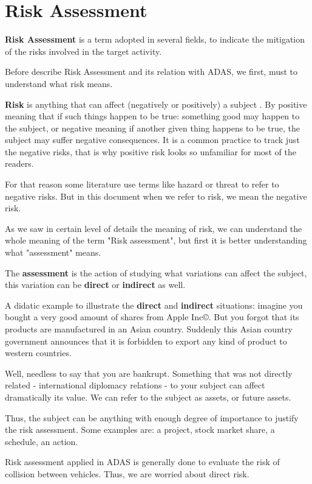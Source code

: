 \section{Risk Assessment}
\label{sec:riskassessment}

\textbf{Risk Assessment} is a term adopted in several fields, to indicate the mitigation of the risks involved in the target activity. 

Before describe Risk Assessment and its relation with ADAS, we first, must to understand what risk means.

\textbf{Risk} is anything that can affect (negatively or positively) a subject \cite{mulcahy2011pmp}. By positive meaning that if such things happen to be true: something good may happen to the subject, or negative meaning if another given thing happens to be true, the subject may suffer negative consequences. It is a common practice to track just the negative risks, that is why positive risk looks so unfamiliar for most of the readers. 

For that reason some literature use terms like hazard or threat to refer to negative risks. But in this document when we refer to risk, we mean the negative risk.

As we saw in certain level of details the meaning of risk, we can understand the whole meaning of the term "Risk assessment", but first it is better understanding what "assessment" means.

The \textbf{assessment} is the action of studying what variations can affect the subject, this variation can be \textbf{direct} or \textbf{indirect} as well.

A didatic example to illustrate the \textbf{direct} and \textbf{indirect} situations: imagine you bought a very good amount of shares from Apple Inc\copyright. But you forgot that its products are manufactured in an Asian country. Suddenly this Asian country government announces that it is forbidden to export any kind of product to western countries. 

Well, needless to say that you are bankrupt. Something that was not directly related - international diplomacy relations - to your subject can affect dramatically its value. We can refer to the subject as assets, or future assets.

Thus, the subject can be anything with enough degree of importance to justify the risk assessment. Some examples are: a project, stock market share, a schedule, an action.

Risk assessment applied in ADAS is generally done to evaluate the risk of collision between vehicles. Thus, we are worried about direct risk. 

